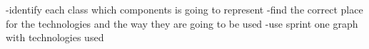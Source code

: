 -identify each class which components is going to represent
-find the correct place for the technologies and the way they are going to be used
-use sprint one graph with technologies used